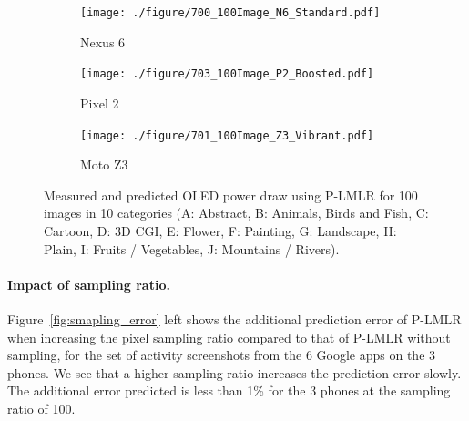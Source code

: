 \begin{figure}[th]
	\begin{subfigure}[]{0.29\textwidth}
		\texttt{[image: ./figure/700\_100Image\_N6\_Standard.pdf]}
		\caption{Nexus 6}
	\end{subfigure}
	\hfill
	\begin{subfigure}[]{0.29\textwidth}
		\texttt{[image: ./figure/703\_100Image\_P2\_Boosted.pdf]}
		\caption{Pixel 2}
	\end{subfigure}
	\hfill
	\begin{subfigure}[]{0.29\textwidth}
		\texttt{[image: ./figure/701\_100Image\_Z3\_Vibrant.pdf]}
		\caption{Moto Z3}
	\end{subfigure}
        \vspace{-0.1in}
	\caption{Measured and predicted OLED power draw using P-LMLR
          for 100 images in 10 categories (A: Abstract, B: Animals, Birds and Fish,
			C: Cartoon, D: 3D CGI, E: Flower, F: Painting, G: Landscape, H: Plain,
			I: Fruits / Vegetables, J: Mountains / Rivers).}
	\label{fig:100_images_expriment}
\end{figure}
\fi


\paragraph{Impact of sampling ratio.}
Figure~\ref{fig:smapling_error} left shows the additional
prediction error of P-LMLR when increasing the pixel sampling ratio
compared to that of P-LMLR without sampling,
for the set of activity screenshots from the 6 Google apps on the 3 phones.
We see that a higher sampling ratio increases the prediction error
slowly. The additional error predicted is less than 1\% for the
3 phones at the sampling ratio of 100.

% 	

